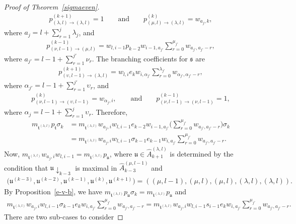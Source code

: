\documentclass[11pt,a4paper,reqno,svgnames]{amsart}
\theoremstyle{plain}
\theoremstyle{definition}
\numberwithin{equation}{section}
\begin{document}
\begin{proof}[Proof of Theorem~\ref{sigmaeven}]
\begin{align*}
p_{(\lambda,l)\to(\lambda,l)}^{(k+1)}=1\qquad\text{and}\qquad
p_{(\mu,l)\to(\lambda,l)}^{(k)}=w_{a_j,k},
\end{align*}
where $a_j= l +\sum_{r=1}^j\lambda_j$, and 
\begin{align*}
p_{(\nu,l-1)\to(\mu,l)}^{(k-1)}
=w_{l,i-1}p_{k-2}w_{i-1,a_{j'}}\sum_{r=0}^{\mu_{j'}}w_{a_{j'},a_{j'}-r},
\end{align*}
where $a_{j'}= l -1+\sum_{r=1}^{j'}\nu_r$. 
The branching coefficients for $\mathfrak{s}$ are 
\begin{align*}
p_{(\upsilon,l-1)\to(\lambda,l)}^{(k+1)}=
w_{l,i}e_{k}w_{i,\alpha_{j'}}\sum_{r=0}^{\lambda_{j'}}
w_{\alpha_{j'},\alpha_{j'}-r},
\end{align*}
where $\alpha_{j'}= l -1+\sum_{r=1}^{j'}\upsilon_r$, and 
\begin{align*}
p_{(\nu,l-1)\to(\upsilon,l-1)}^{(k)}=w_{\alpha_j,i},
\qquad\text{and}\qquad
p_{(\nu,l-1)\to(\nu,l-1)}^{(k-1)}=1,
\end{align*}
where $\alpha_j= l -1+\sum_{r=1}^j\upsilon_r$. Therefore,
\begin{align*}
m_{\mathfrak{t}^{(\lambda,l)}} p_\mathfrak{t}\sigma_{k}
&=m_{\mathfrak{t}^{(\lambda,l)}} w_{a_j,i}w_{ l ,i-1}e_{k-2}w_{i-1,a_{j'}}\bigg(\sum_{r=0}^{\mu_{j'}}w_{a_{j'},a_{j'}-r}\bigg)\sigma_{k}\\
&=m_{\mathfrak{t}^{(\lambda,l)}} w_{a_j,i}w_{ l ,i-1}\sigma_{k-1}e_{k-1}w_{i,a_{j'}}\sum_{r=0}^{\mu_{j'}}w_{a_{j'},a_{j'}-r}.
\end{align*}
Now, $m_{\mathfrak{t}^{(\lambda,l)}} w_{a_j,i}w_{ l ,i-1}=m_{\mathfrak{t}^{(\lambda,l)}} p_\mathfrak{u}$, where $\mathfrak{u}\in\hat{A}_{k+1}^{(\lambda,l)}$ is determined by the condition that $\mathfrak{u}\downarrow_{k-3}$ is maximal in $\hat{A}_{k-3}^{(\mu,l-1)}$ and 
\begin{align*}
\big(\mathfrak{u}^{(k-3)},\mathfrak{u}^{(k-2)},\mathfrak{u}^{(k-1)},\mathfrak{u}^{(k)},\mathfrak{u}^{(k+1)}\big)=((\mu,l-1),(\mu,l),(\mu,l),(\lambda,l),(\lambda,l)).
\end{align*}
By Proposition~\ref{e-v-b}, we have $m_{\mathfrak{t}^{(\lambda,l)}} p_\mathfrak{u}\sigma_{k}= m_{\mathfrak{t}^{(\lambda,l)}} p_\mathfrak{u}$ 
and
\begin{align}\label{twocases}
m_{\mathfrak{t}^{(\lambda,l)}} w_{a_j,i}w_{ l ,i-1}\sigma_{k-1}e_kw_{i,a_{j'}}\sum_{r=0}^{\mu_{j'}}w_{a_{j'},a_{j'}-r}
= m_{\mathfrak{t}^{(\lambda,l)}} w_{a_j,i}w_{ l ,i-1}s_{i-1}e_kw_{i,a_{j'}}\sum_{r=0}^{\mu_{j'}}w_{a_{j'},a_{j'}-r}.
\end{align}
There are two sub-cases to consider


\end{proof}
\end{document}
